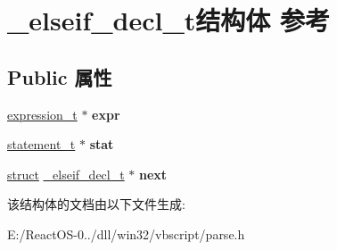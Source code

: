 \hypertarget{struct__elseif__decl__t}{}\section{\+\_\+elseif\+\_\+decl\+\_\+t结构体 参考}
\label{struct__elseif__decl__t}
\subsection*{Public 属性}
\begin{DoxyCompactItemize}
\item 
\mbox{\label{struct__elseif__decl__t_aa34f0e9a66630a96a69f2a68f986fa45}} 
\hyperlink{struct__expression__t}{expression\+\_\+t} $\ast$ {\bfseries expr}
\item 
\mbox{\label{struct__elseif__decl__t_a5b40d52b9ee15436876e6c2d6e3af5ae}} 
\hyperlink{struct__statement__t}{statement\+\_\+t} $\ast$ {\bfseries stat}
\item 
\mbox{\label{struct__elseif__decl__t_af7ed68d17275da541a6f54f8a2315c9b}} 
\hyperlink{interfacestruct}{struct} \hyperlink{struct__elseif__decl__t}{\+\_\+elseif\+\_\+decl\+\_\+t} $\ast$ {\bfseries next}
\end{DoxyCompactItemize}


该结构体的文档由以下文件生成\+:\begin{DoxyCompactItemize}
\item 
E\+:/\+React\+O\+S-\/0../dll/win32/vbscript/parse.\+h\end{DoxyCompactItemize}
